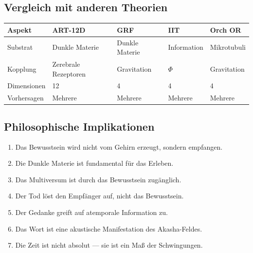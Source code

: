 \documentclass[11pt,a4paper]{article}
\begin{document}
\subsection{Vergleich mit anderen Theorien}
\begin{table}[H]
\centering
\begin{tabular}{@{}lllll@{}}
\toprule
\textbf{Aspekt} & \textbf{ART-12D} & \textbf{GRF} & \textbf{IIT} & \textbf{Orch OR} \\ \midrule
Substrat & Dunkle Materie & Dunkle Materie & Information & Mikrotubuli \\
Kopplung & Zerebrale Rezeptoren & Gravitation & $\Phi$ & Gravitation \\
Dimensionen & 12 & 4 & 4 & 4 \\
Vorhersagen & Mehrere & Mehrere & Mehrere & Mehrere \\ \bottomrule
\end{tabular}
\end{table}

\subsection{Philosophische Implikationen}
\begin{enumerate}
    \item Das Bewusstsein wird nicht vom Gehirn erzeugt, sondern empfangen.
    \item Die Dunkle Materie ist fundamental für das Erleben.
    \item Das Multiversum ist durch das Bewusstsein zugänglich.
    \item Der Tod löst den Empfänger auf, nicht das Bewusstsein.
    \item Der Gedanke greift auf atemporale Information zu.
    \item Das Wort ist eine akustische Manifestation des Akasha-Feldes.
    \item Die Zeit ist nicht absolut --- sie ist ein Maß der Schwingungen.
\end{enumerate}
\end{document}
